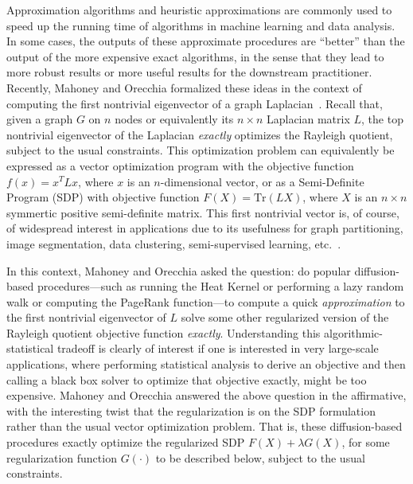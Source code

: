 \documentclass[12pt]{article}
\theoremstyle{plain}
\begin{document}
Approximation algorithms and heuristic approximations are commonly used to
speed up the running time of algorithms in machine learning and data
analysis.
In some cases, the outputs of these approximate procedures are ``better''
than the output of the more expensive exact algorithms, in the sense that
they lead to more robust results or more useful results for the downstream
practitioner.
Recently, Mahoney and Orecchia formalized these ideas in the context of
computing the first nontrivial eigenvector of a graph
Laplacian~\cite{mahoney2010implementing}.
Recall that, given a graph $G$ on $n$ nodes or equivalently its $n \times n$
Laplacian matrix $L$, the top nontrivial eigenvector of the Laplacian
\emph{exactly} optimizes the Rayleigh quotient, subject to the usual
constraints.
This optimization problem can equivalently be expressed as a vector
optimization program with the objective function $f(x) = x^TLx$,
where $x$ is an $n$-dimensional vector, or as a Semi-Definite Program (SDP)
with objective function $F(X)=\mathrm{Tr}(L X)$, where $X$ is an $n \times n$
symmertic positive semi-definite matrix.
This first nontrivial vector is, of course, of widespread interest in
applications due to its usefulness for graph partitioning, image
segmentation, data clustering, semi-supervised learning, etc.~\cite{spielman96_spectral,guatterymiller98,ShiMalik00_NCut,BN03,Joa03,LLDM09_communities_IM}.

In this context, Mahoney and Orecchia asked the question: do popular
diffusion-based procedures---such as running the Heat Kernel or performing a
lazy random walk or computing the PageRank function---to compute a quick
\emph{approximation} to the first nontrivial eigenvector of $L$ solve some
other regularized version of the Rayleigh quotient objective function
\emph{exactly}.
Understanding this algorithmic-statistical tradeoff is clearly of interest
if one is interested in very large-scale applications, where performing
statistical analysis to derive an objective and then calling a black box
solver to optimize that objective exactly, might be too expensive.
Mahoney and Orecchia answered the above question in the affirmative, with
the interesting twist that the regularization is on the SDP formulation
rather than the usual vector optimization problem.
That is, these diffusion-based procedures exactly optimize the regularized
SDP $F(X)+\lambda G(X)$, for some regularization function $G(\cdot)$ to be
described below, subject to the usual constraints.
\end{document}
